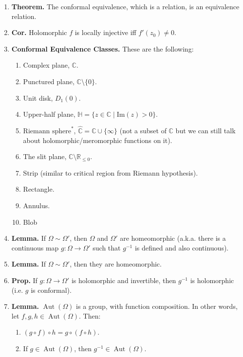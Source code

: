 \documentclass[12pt]{article}
\theoremstyle{definition}
\theoremstyle{named}
\DeclareMathOperator{\Aut}{Aut}
\begin{document}
{\begin{multicols}{2}
\begin{spacing}{1.01}
\begin{enumerate}
\begin{enumerate}
    \end{enumerate}
    \item \textbf{Theorem. } The conformal equivalence, which is a relation, is an equivalence relation. 
    \item \textbf{Cor. } Holomorphic $f$ is locally injective iff $f'(z_0) \neq 0$.  
    \item \textbf{Conformal Equivalence Classes. } These are the following: 
    \begin{enumerate}
        \item Complex plane, $\mathbb{C}$. 
        \item Punctured plane, $\mathbb{C} \setminus \{0\}$. 
        \item Unit disk, $D_1(0)$. 
        \item Upper-half plane, $\mathbb{H} = \{z \in \mathbb{C} \mid \textrm{Im}(z) > 0\}$. 
        \item $\textrm{Riemann sphere}^*$, $\hat{\mathbb{C}} = \mathbb{C} \cup \{\infty\}$ (not a subset of $\mathbb{C}$ but we can still talk about holomorphic/meromorphic functions on it). 
        \item The slit plane, $\mathbb{C} \setminus \mathbb{R}_{\leq 0}$. 
        \item Strip (similar to critical region from Riemann hypothesis). 
        \item Rectangle. 
        \item Annulus. 
        \item Blob
    \end{enumerate}
    \item \textbf{Lemma. } If $\Omega \sim \Omega'$, then $\Omega$ and $\Omega'$ are homeomorphic (a.k.a. there is a continuous map $g: \Omega \to \Omega'$ such that $g^{-1}$ is defined and also continuous). 
    \item \textbf{Lemma. } If $\Omega \sim \Omega'$, then they are homeomorphic. 
    \item \textbf{Prop. } If $g: \Omega \to \Omega'$ is holomorphic and invertible, then $g^{-1}$ is holomorphic (i.e. $g$ is conformal). 
    \item \textbf{Lemma. } $\Aut(\Omega)$ is a group, with function composition. In other words, let $f,g,h \in \Aut(\Omega)$. Then: 
    \begin{enumerate}
        \item $(g \circ f) \circ h = g \circ (f \circ h)$. 
        \item If $g \in \Aut(\Omega)$, then $g^{-1} \in \Aut(\Omega)$. 

\end{enumerate}
\end{enumerate}
\end{spacing}
\end{multicols}}
\end{document}
